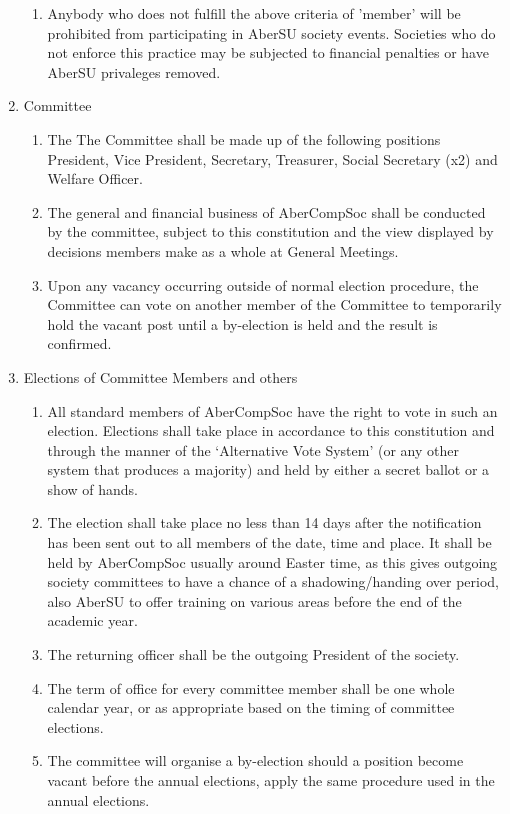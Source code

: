 \documentclass{article}
\begin{document}
\begin{enumerate}
\begin{enumerate}
            \item Anybody who does not fulfill the above criteria of 'member' will be prohibited from participating in AberSU society events. Societies who do not enforce this practice may be subjected to financial penalties or have AberSU privaleges removed.
        \end{enumerate}
    \item Committee
        \begin{enumerate}
            \item The The Committee shall be made up of the following positions President, Vice President, Secretary, Treasurer, Social Secretary (x2) and Welfare Officer.
            \item The general and financial business of AberCompSoc shall be conducted by the committee, subject to this constitution and the view displayed by decisions members make as a whole at General Meetings.
            \item Upon any vacancy occurring outside of normal election procedure, the Committee can vote on another member of the Committee to temporarily hold the vacant post until a by-election is held and the result is confirmed.
        \end{enumerate}
    \item Elections of Committee Members and others
        \begin{enumerate}
            \item All standard members of AberCompSoc have the right to vote in such an election. Elections shall take place in accordance to this constitution and through the manner of the ‘Alternative Vote System’ (or any other system that produces a majority) and held by either a secret ballot or a show of hands.
            \item The election shall take place no less than 14 days after the notification has been sent out to all members of the date, time and place. It shall be held by AberCompSoc usually around Easter time, as this gives outgoing society committees to have a chance of a shadowing/handing over period, also AberSU to offer training on various areas before the end of the academic year.
            \item The returning officer shall be the outgoing President of the society.
            \item The term of office for every committee member shall be one whole calendar year, or as appropriate based on the timing of committee elections.
            \item The committee will organise a by-election should a position become vacant before the annual elections, apply the same procedure used in the annual elections.

\end{enumerate}
\end{enumerate}
\end{document}
